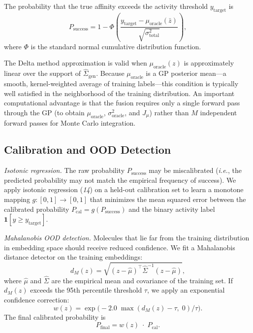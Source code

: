 \documentclass{article}
\newcommand{\Psuccess}{P_{\mathrm{success}}}
\newcommand{\Pfinal}{P_{\mathrm{final}}}
\newcommand{\Pcal}{P_{\mathrm{cal}}}
\newcommand{\Uoracle}{\sigma^{2}_{\mathrm{oracle}}}
\newcommand{\Utotal}{\sigma^{2}_{\mathrm{total}}}
\newcommand{\muoracle}{\mu_{\mathrm{oracle}}}
\newcommand{\Siggen}{\hat{\Sigma}_{\mathrm{gen}}}
\newcommand{\zbar}{\bar{z}}
\newcommand{\ytarget}{y_{\mathrm{target}}}
\newcommand{\Jmu}{J_{\mu}}
\newcommand{\ie}{\textit{i.e.}}
\newcommand{\scite}[1]{(\textit{#1})}
\begin{document}
The probability that the true affinity exceeds the activity threshold
$\ytarget$ is
\begin{equation}
  \Psuccess
  = 1 - \Phi\!\!\left(\frac{\ytarget - \muoracle(\zbar)}
                             {\sqrt{\Utotal}}\right),
  \label{eq:psuccess}
\end{equation}
where $\Phi$ is the standard normal cumulative distribution function.

The Delta method approximation is valid when $\muoracle(z)$ is
approximately linear over the support of $\Siggen$.  Because
$\muoracle$ is a GP posterior mean---a smooth, kernel-weighted average of
training labels---this condition is typically well satisfied in the
neighborhood of the training distribution.  An important computational
advantage is that the fusion requires only a single forward pass through
the GP (to obtain $\muoracle$, $\Uoracle$, and $\Jmu$) rather than $M$
independent forward passes for Monte Carlo integration.

\subsection{Calibration and OOD Detection}

\textit{Isotonic regression.}
The raw probability $\Psuccess$ may be miscalibrated (\ie, the predicted
probability may not match the empirical frequency of success).  We apply
isotonic regression \scite{14} on a held-out calibration set to learn a
monotone mapping $g\colon [0,1] \to [0,1]$ that minimizes the mean
squared error between the calibrated probability $\Pcal = g(\Psuccess)$
and the binary activity label $\mathbf{1}[y \geq \ytarget]$.

\textit{Mahalanobis OOD detection.}
Molecules that lie far from the training distribution in embedding space
should receive reduced confidence.  We fit a Mahalanobis distance
detector on the training embeddings:
\begin{equation}
  d_{M}(z)
  = \sqrt{(z - \hat{\mu})^{\!\top}\hat{\Sigma}^{-1}(z - \hat{\mu})},
  \label{eq:mahalanobis}
\end{equation}
where $\hat{\mu}$ and $\hat{\Sigma}$ are the empirical mean and
covariance of the training set.  If $d_{M}(z)$ exceeds the 95th
percentile threshold $\tau$, we apply an exponential confidence
correction:
\begin{equation}
  w(z) = \exp\!\bigl(-2.0\;\max(d_{M}(z) - \tau,\;0)/\tau\bigr).
  \label{eq:ood_weight}
\end{equation}
The final calibrated probability is
\begin{equation}
  \Pfinal = w(z)\;\cdot\;\Pcal.
  \label{eq:pfinal}
\end{equation}
\end{document}
